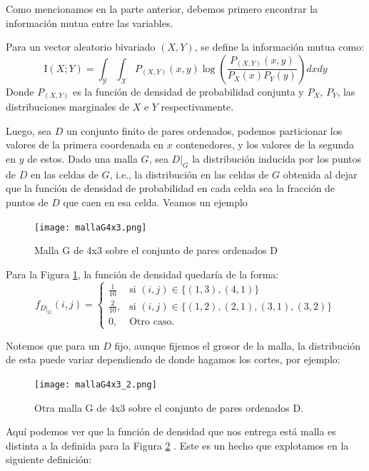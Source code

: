 	Como mencionamos en la parte anterior, debemos primero encontrar la informaci\'on mutua entre las variables.

	\begin{defn}
		Para un vector aleatorio bivariado $(X,Y)$, se define la informaci\'on mutua como:
		$$
		\mathrm{I}(X ; Y)=\int_{\mathcal{Y}} \int_{\mathcal{X}} P_{(X, Y)}(x, y) \log \left(\frac{P_{(X, Y)}(x, y)}{P_{X}(x) P_{Y}(y)}\right)dxdy
		$$
		Donde $P_{(X, Y)}$ es la funci\'on de densidad de probabilidad conjunta y $P_{X}$, $P_{Y}$, las distribuciones marginales de $X$ e $Y$ respectivamente. 
	\end{defn}

	Luego, sea $D$ un conjunto finito de pares ordenados, podemos particionar los valores de la primera coordenada en $x$ contenedores, y los valores de la segunda en $y$ de estos. Dado una malla $G$, sea $D|_G$ la distribuci\'on inducida por los puntos de $D$ en las celdas de $G$, i.e., la distribuci\'on en las celdas de $G$ obtenida al dejar que la funci\'on de densidad de probabilidad en cada celda sea la fracci\'on de puntos de $D$ que caen en esa celda. Veamos un ejemplo
	\begin{figure}[H]
		\centering
		\texttt{[image: mallaG4x3.png]}
		\caption{Malla G de 4x3 sobre el conjunto de pares ordenados D}
		\label{mallaG}
	\end{figure}

	Para la Figura \ref{mallaG}, la funci\'on de densidad quedar\'ia de la forma:
	\[
		f_{D|_G}(i,j) = \left\{\begin{array}{lr}
			\frac{1}{10} & \text{si } (i,j) \in \{ (1,3), (4,1)\} \\
			\frac{2}{10}, & \text{si }(i,j) \in \{ (1,2), (2,1), (3,1),(3,2)\}  \\
			0, & \text{Otro caso.}
			\end{array}\right.
	\]



	Notemos que para un $D$ fijo, aunque fijemos el grosor de la malla, la distribuci\'on de esta puede variar dependiendo de donde hagamos los cortes, por ejemplo:

	\begin{figure}[H] 
		\centering
		\texttt{[image: mallaG4x3\_2.png]}
		\caption{Otra malla G de 4x3 sobre el conjunto de pares ordenados D.}
		\label{malla_G_2}
	\end{figure}

	Aqu\'i podemos ver que la funci\'on de densidad que nos entrega est\'a malla es distinta a la definida para la Figura \ref{malla_G_2} . Este es un hecho que explotamos en la siguiente definici\'on: 

